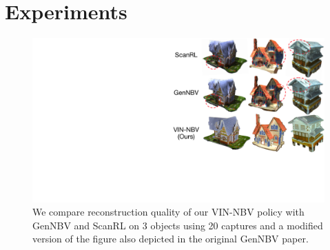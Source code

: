 \section{Experiments}
\label{sec:results}
\vspace{-0.25em}

\begin{figure}
  \centering
    \includegraphics[width=\columnwidth]{Figures/COMP3.pdf}
    \vspace{-0.5em}
    \caption{We compare reconstruction quality of our VIN-NBV policy with GenNBV \cite{chen2024gennbv} and ScanRL \cite{peralta2020next} on 3 objects using 20 captures and a modified version of the figure also depicted in the original GenNBV \cite{chen2024gennbv} paper.}
    \label{fig:three_house}
    \vspace{-1em}
\end{figure}

